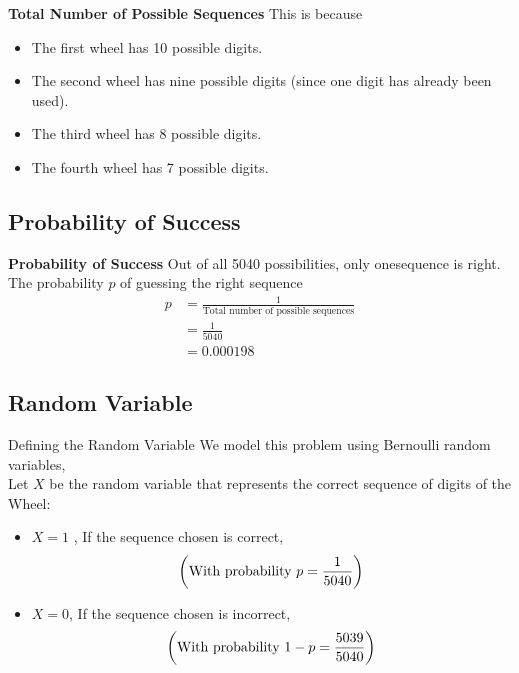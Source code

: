 \documentclass{beamer}
\providecommand{\brak}[1]{\ensuremath{\left(#1\right)}}
\theoremstyle{remark}
\numberwithin{equation}{section}
\begin{document}
\begin{frame}{\textbf{Total Number of Possible Sequences}}
    This is because 
    \begin{itemize}
        \item The first wheel has 10 possible digits.
        \item The second wheel has nine possible digits (since one digit has already been used).
        \item The third wheel has 8 possible digits.
        \item The fourth wheel has 7 possible digits.
    \end{itemize}
\end{frame}

\subsection{Probability of Success}
\begin{frame}{\textbf{Probability of Success}}
    Out of all 5040 possibilities, only onesequence is right. The probability $p$ of guessing the right sequence 
    \begin{align}
        p &= \frac{1}{\text{Total number of possible sequences}}\\ &= \frac{1}{5040}\\ &= 0.000198
    \end{align}
\end{frame}

\subsection{Random Variable}
\begin{frame}{Defining the Random Variable}
    We model this problem using Bernoulli random variables,\\
    Let $X$ be the random variable that represents the correct sequence of digits of the Wheel:
    \begin{itemize}
        \item $X = 1$ , If the sequence chosen is correct,
        \begin{align}
            \text{\brak{\text{With probability }p = \frac{1}{5040}}}
        \end{align}
        \item $X = 0$, If the sequence chosen is incorrect,
        \begin{align}
            \text{\brak{\text{With probability } 1 -p = \frac{5039}{5040}}}
        \end{align}
    \end{itemize}
\end{frame}
\end{document}
